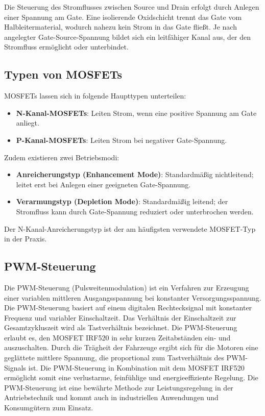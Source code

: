 Die Steuerung des Stromflusses zwischen Source und Drain erfolgt durch Anlegen einer Spannung am Gate. Eine isolierende Oxidschicht trennt das Gate vom Halbleitermaterial, wodurch nahezu kein Strom in das Gate fließt. Je nach angelegter Gate-Source-Spannung bildet sich ein leitfähiger Kanal aus, der den Stromfluss ermöglicht oder unterbindet.

\subsection{Typen von MOSFETs}

MOSFETs lassen sich in folgende Haupttypen unterteilen:

\begin{itemize}
	\label{sec:NKanalMOSFETs}
	\item \textbf{N-Kanal-MOSFETs}: Leiten Strom, wenn eine positive Spannung am Gate anliegt.
	\item \textbf{P-Kanal-MOSFETs}: Leiten Strom bei negativer Gate-Spannung.
\end{itemize}

Zudem existieren zwei Betriebsmodi:
\begin{itemize}
	\item \textbf{Anreicherungstyp (Enhancement Mode)}: Standardmäßig nichtleitend; leitet erst bei Anlegen einer geeigneten Gate-Spannung.
	\item \textbf{Verarmungstyp (Depletion Mode)}: Standardmäßig leitend; der Stromfluss kann durch Gate-Spannung reduziert oder unterbrochen werden.
\end{itemize}

Der N-Kanal-Anreicherungstyp ist der am häufigsten verwendete MOSFET-Typ in der Praxis.


\subsection{PWM-Steuerung}

Die PWM-Steuerung (Pulsweitenmodulation) ist ein Verfahren zur Erzeugung einer variablen mittleren Ausgangsspannung bei konstanter Versorgungsspannung. Die PWM-Steuerung basiert auf einem digitalen Rechtecksignal mit konstanter Frequenz und variabler Einschaltzeit. Das Verhältnis der Einschaltzeit zur Gesamtzykluszeit wird als Tastverhältnis bezeichnet. Die PWM-Steuerung erlaubt es, den MOSFET IRF520 in sehr kurzen Zeitabständen ein- und auszuschalten. Durch die Trägheit der Fahrzeuge ergibt sich für die Motoren eine geglättete mittlere Spannung, die proportional zum Tastverhältnis des PWM-Signals ist. Die PWM-Steuerung in Kombination mit dem MOSFET IRF520 ermöglicht somit eine verlustarme, feinfühlige und energieeffiziente Regelung. Die PWM-Steuerung ist eine bewährte Methode zur Leistungsregelung in der Antriebstechnik und kommt auch in industriellen Anwendungen und Konsumgütern zum Einsatz. \cite{Gehrke.2022}



